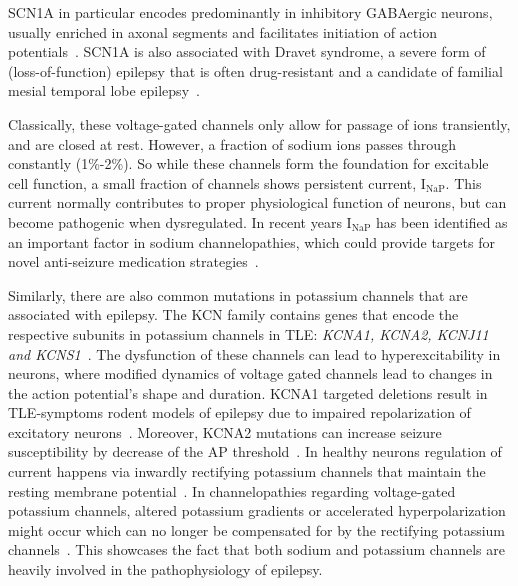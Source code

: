 SCN1A in particular encodes predominantly in inhibitory GABAergic neurons, usually enriched in axonal segments and facilitates initiation of action potentials~\parencite{yuReducedSodiumCurrent2006}.
SCN1A is also associated with Dravet syndrome, a severe form of (loss-of-function) epilepsy that is often drug-resistant and a
candidate of familial mesial temporal lobe epilepsy~\parencite{hwangGeneticsTemporalLobe2012a}.

Classically, these voltage-gated channels only allow for passage of ions transiently, and are closed at rest.
However, a fraction of sodium ions passes through constantly (1\%-2\%).
So while these channels form the foundation for excitable cell function, a small fraction of channels shows persistent current, \(\text{I}_{\text{NaP}}\).
This current normally contributes to proper physiological function of neurons, but can become pathogenic when dysregulated.
In recent years \(\text{I}_{\text{NaP}}\) has been identified as an important factor in sodium channelopathies, which could provide targets for novel anti-seizure medication strategies~\parencite{wengertRolePersistentSodium2021}.

Similarly, there are also common mutations in potassium channels that are associated with epilepsy.
The KCN family contains genes that encode the respective subunits in potassium channels in TLE\@: \textit{KCNA1, KCNA2, KCNJ11 and KCNS1}~\parencite{gaoPotassiumChannelsEpilepsy2022,zhangIdentificationKeyPotassium2023}.
The dysfunction of these channels can lead to hyperexcitability in neurons, where modified dynamics of voltage gated channels lead to changes in the action potential's shape and duration.
KCNA1 targeted deletions result in TLE-symptoms rodent models of epilepsy due to impaired repolarization of excitatory neurons~\parencite{eunsonClinicalGeneticExpression2000}.
Moreover, KCNA2 mutations can increase seizure susceptibility by decrease of the AP threshold~\parencite{liuRescuingKv10Protein2020}.
In healthy neurons regulation of current happens via inwardly rectifying potassium channels that maintain the resting membrane potential~\parencite{isomotoInwardlyRectifyingPotassium1997}.
In channelopathies regarding voltage-gated potassium channels, altered potassium gradients or accelerated hyperpolarization might occur which can no longer be compensated for by the rectifying
potassium channels~\parencite{nikitinPotassiumChannelsProminent2021}. This showcases the fact that both sodium and potassium channels are heavily involved in the pathophysiology of epilepsy.

